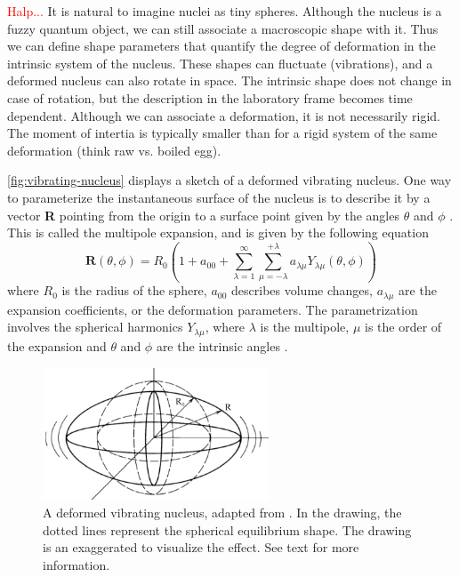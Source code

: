 \documentclass[twoside,english]{uiofysmaster/uiofysmaster}
\let\orgautoref\autoref
\renewcommand{\autoref}
        {%
		 \def\sectionautorefname{Section}%
		 \def\subsectionautorefname{Section}%
		 \def\subsubsectionautorefname{Section}%
		 \def\chapterautorefname{Chapter}%
          \orgautoref}
\begin{document}
\textcolor{red}{Halp...}
It is natural to imagine nuclei as tiny spheres.
Although the nucleus is a fuzzy quantum object, we can still associate a macroscopic shape with it.
Thus we can define shape parameters that quantify the degree of deformation in the intrinsic system of the nucleus. 
These shapes can fluctuate (vibrations), and a deformed nucleus can also rotate in space.
The intrinsic shape does not change in case of rotation, but the description in the laboratory frame becomes time dependent. 
Although we can associate a deformation, it is not necessarily rigid. 
The moment of intertia is typically smaller than for a rigid system of the same deformation (think raw vs. boiled egg).

\autoref{fig:vibrating-nucleus} displays a sketch of a deformed vibrating nucleus.
One way to parameterize the instantaneous surface of the nucleus is to describe it by a vector \textbf{R} pointing from the origin to a surface point given by the angles $\theta$ and $\phi$ \cite{Krane}.
This is called the multipole expansion, and is given by the following equation
\begin{equation}\label{eq:Rfull}
	\mathbf{R}(\theta, \phi) = R_0 \left( 1 + a_{00} + \sum^\infty_{\lambda = 1} \sum^{+\lambda}_{\mu = -\lambda} a_{\lambda \mu} Y_{\lambda \mu}(\theta, \phi) \right)
\end{equation}
where $R_0$ is the radius of the sphere, $a_{00}$ describes volume changes, $a_{\lambda \mu}$ are the expansion coefficients, or the deformation parameters. 
The parametrization involves the spherical harmonics $Y_{\lambda \mu}$, where $\lambda$ is the multipole, $\mu$ is the order of the expansion and $\theta$ and $\phi$ are the intrinsic angles \cite{Krane, RS, Klintefjord}. 

\begin{figure}[ht]
	\centering
	\includegraphics[width=0.6\textwidth]{Images/vibrating-nucleus.png}
	\caption{A deformed vibrating nucleus, adapted from \cite{Krane}. In the drawing, the dotted lines represent the spherical equilibrium shape. The drawing is an exaggerated to visualize the effect. See text for more information.}
	\label{fig:vibrating-nucleus}
\end{figure}
\end{document}

